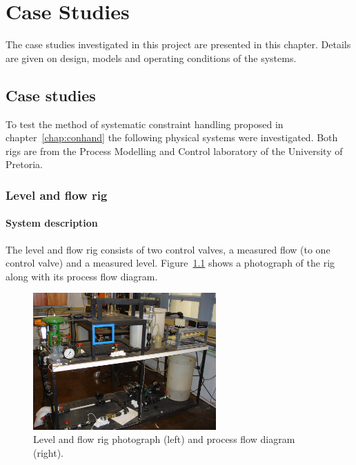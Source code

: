 \chapter{Case Studies}\label{chap:casestudies}
\begin{overview}
  The case studies investigated in this project are presented in this chapter.
  Details are given on design, models and operating conditions of the systems. 
\end{overview}

\section{Case studies}
To test the method of systematic constraint handling proposed in chapter~\ref{chap:conhand} the following physical systems were investigated.
Both rigs are from the Process Modelling and Control laboratory of the University of Pretoria.

\subsection{Level and flow rig}
\subsubsection{System description}
The level and flow rig consists of two control valves, a measured flow (to one control valve) and a measured level.
Figure~\ref{fig:flowphoto} shows a photograph of the rig along with its process flow diagram.
\begin{figure}[htbp]
  \centering
    \includegraphics[width=7.0cm]{graph/flowphoto.JPG}
    \scalebox{0.8}{}  
  \caption[Level and flow rig photograph and flow diagram]{Level and flow rig photograph (left) and process flow diagram (right).}
  \label{fig:flowphoto}
\end{figure}

